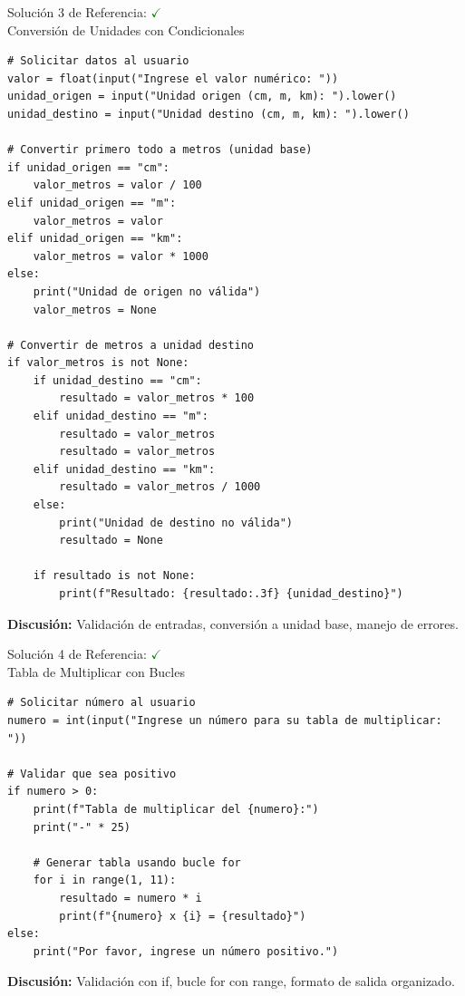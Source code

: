 \documentclass[10pt]{beamer}
\begin{document}
\begin{frame}[fragile]{Solución 3 de Referencia: \hfill \textcolor{green}{$\checkmark$} \\ Conversión de Unidades con Condicionales}
\begin{verbatim}
# Solicitar datos al usuario
valor = float(input("Ingrese el valor numérico: "))
unidad_origen = input("Unidad origen (cm, m, km): ").lower()
unidad_destino = input("Unidad destino (cm, m, km): ").lower()

# Convertir primero todo a metros (unidad base)
if unidad_origen == "cm":
    valor_metros = valor / 100
elif unidad_origen == "m":
    valor_metros = valor
elif unidad_origen == "km":
    valor_metros = valor * 1000
else:
    print("Unidad de origen no válida")
    valor_metros = None

# Convertir de metros a unidad destino
if valor_metros is not None:
    if unidad_destino == "cm":
        resultado = valor_metros * 100
    elif unidad_destino == "m":
        resultado = valor_metros	    
        resultado = valor_metros
    elif unidad_destino == "km":
        resultado = valor_metros / 1000
    else:
        print("Unidad de destino no válida")
        resultado = None

    if resultado is not None:
        print(f"Resultado: {resultado:.3f} {unidad_destino}")
\end{verbatim}
\textbf{Discusión:} Validación de entradas, conversión a unidad base, manejo de errores.
\end{frame}

\begin{frame}[fragile]{Solución 4 de Referencia: \hfill \textcolor{green}{$\checkmark$} \\ Tabla de Multiplicar con Bucles}
\begin{verbatim}
# Solicitar número al usuario
numero = int(input("Ingrese un número para su tabla de multiplicar: "))

# Validar que sea positivo
if numero > 0:
    print(f"Tabla de multiplicar del {numero}:")
    print("-" * 25)

    # Generar tabla usando bucle for
    for i in range(1, 11):
        resultado = numero * i
        print(f"{numero} x {i} = {resultado}")
else:
    print("Por favor, ingrese un número positivo.")
\end{verbatim}
\textbf{Discusión:} Validación con if, bucle for con range, formato de salida organizado.
\end{frame}
\end{document}
